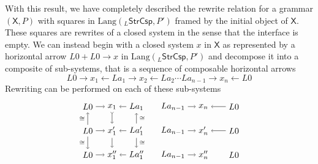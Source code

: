\documentclass{amsart}
\newcommand{\X}{\cat{X}}
\newcommand{\StrCsp}{\cat{StrCsp}}
\newcommand{\Lang}{\mathrm{Lang}}
\newcommand{\cat}[1]{\mathsf{#1}}
\renewcommand{\gets}{\leftarrow}
\newcommand{\csp}[3]{#1 + #3 \to #2}
\theoremstyle{remark}
\theoremstyle{definition}
\begin{document}
With this result, we have completely described the rewrite
relation for a grammar $ ( \X , P ) $ with squares in
$ \Lang ( _{L}\StrCsp, P' ) $ framed by the initial
object of $ \X $.  These squares are rewrites of a closed
system in the sense that the interface is empty.  We can
instead begin with a closed system $ x $ in $ \X $ as
represented by a horizontal arrow $ \csp{L0}{x}{L0} $ in
$ \Lang ( _{L}\StrCsp , P' ) $ and decompose it into a
composite of sub-systems, that is a sequence of composable
horizontal arrows
%
\[
  L0 \to x_1 \gets La_1 \to x_2 \gets La_2 \dotsm La_{n-1} \to x_n
  \gets L0
\]
Rewriting can be performed on each of these sub-systems
%
\[
  \begin{tikzpicture}
    \begin{scope}[shift={(0,3)}]
      \node (1) at (0,2) {$ L0 $};
      \node (2) at (1,2) {$ x_1 $};
      \node (3) at (2,2) {$ La_1 $};
      \node (4) at (0,1) {$ L0 $};
      \node (5) at (1,1) {$ x'_1 $};
      \node (6) at (2,1) {$ La'_1 $};
      \node (7) at (0,0) {$ L0 $};
      \node (8) at (1,0) {$ x''_1 $};
      \node (9) at (2,0) {$ La''_1 $};
      \draw [->] (1) to node [] {\scriptsize{$  $}} (2);
      \draw [->] (3) to node [] {\scriptsize{$  $}} (2);
      \draw [->] (4) to node [] {\scriptsize{$  $}} (5);
      \draw [->] (6) to node [] {\scriptsize{$  $}} (5);
      \draw [->] (7) to node [] {\scriptsize{$  $}} (8);
      \draw [->] (9) to node [] {\scriptsize{$  $}} (8);
      \draw [->] (4) to node [left] {\scriptsize{$ \cong $}} (1);
      \draw [->] (4) to node [left] {\scriptsize{$ \cong $}} (7);
      \draw [>->] (2) to node [] {\scriptsize{$  $}} (5);
      \draw [->] (5) to node [] {\scriptsize{$  $}} (8);
      \draw [->] (6) to node [right] {\scriptsize{$ \cong  $}} (3);
      \draw [->] (6) to node [right] {\scriptsize{$ \cong $}} (9);
    \end{scope}
    \begin{scope}[shift={(3.5,3)}]
      \node (1) at (0,2) {$ La_{n-1} $};
      \node (2) at (1.25,2) {$ x_n $};
      \node (3) at (2.5,2) {$ L0 $};
      \node (4) at (0,1) {$ La_{n-1} $};
      \node (5) at (1.25,1) {$ x'_n $};
      \node (6) at (2.5,1) {$ L0 $};
      \node (7) at (0,0) {$ La_{n-1} $};
      \node (8) at (1.25,0) {$ x''_n $};
      \node (9) at (2.5,0) {$ L0 $};
       \draw [->] (1) to node [] {\scriptsize{$  $}} (2);
      \draw [->] (3) to node [] {\scriptsize{$  $}} (2);
      \draw [->] (4) to node [] {\scriptsize{$  $}} (5);
      \draw [->] (6) to node [] {\scriptsize{$  $}} (5);
      \draw [->] (7) to node [] {\scriptsize{$  $}} (8);

\end{scope}
\end{tikzpicture}\]
\end{document}
